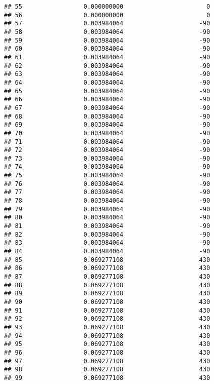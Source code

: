 \documentclass[]{article}
\begin{document}
\begin{verbatim}
## 55                 0.000000000                       0
## 56                 0.000000000                       0
## 57                 0.003984064                     -90
## 58                 0.003984064                     -90
## 59                 0.003984064                     -90
## 60                 0.003984064                     -90
## 61                 0.003984064                     -90
## 62                 0.003984064                     -90
## 63                 0.003984064                     -90
## 64                 0.003984064                     -90
## 65                 0.003984064                     -90
## 66                 0.003984064                     -90
## 67                 0.003984064                     -90
## 68                 0.003984064                     -90
## 69                 0.003984064                     -90
## 70                 0.003984064                     -90
## 71                 0.003984064                     -90
## 72                 0.003984064                     -90
## 73                 0.003984064                     -90
## 74                 0.003984064                     -90
## 75                 0.003984064                     -90
## 76                 0.003984064                     -90
## 77                 0.003984064                     -90
## 78                 0.003984064                     -90
## 79                 0.003984064                     -90
## 80                 0.003984064                     -90
## 81                 0.003984064                     -90
## 82                 0.003984064                     -90
## 83                 0.003984064                     -90
## 84                 0.003984064                     -90
## 85                 0.069277108                     430
## 86                 0.069277108                     430
## 87                 0.069277108                     430
## 88                 0.069277108                     430
## 89                 0.069277108                     430
## 90                 0.069277108                     430
## 91                 0.069277108                     430
## 92                 0.069277108                     430
## 93                 0.069277108                     430
## 94                 0.069277108                     430
## 95                 0.069277108                     430
## 96                 0.069277108                     430
## 97                 0.069277108                     430
## 98                 0.069277108                     430
## 99                 0.069277108                     430

\end{verbatim}
\end{document}
